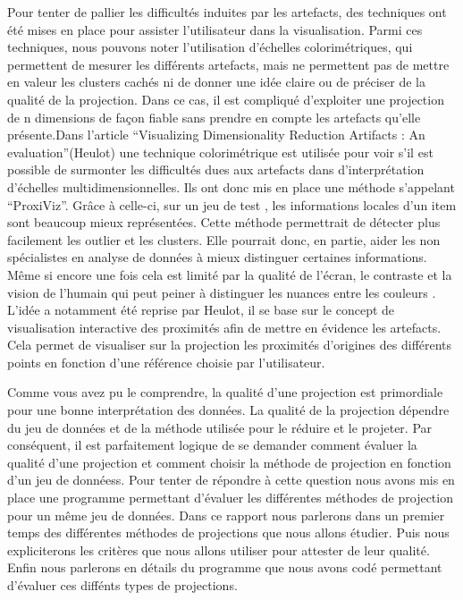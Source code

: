 \smallskip
Pour tenter de pallier les difficultés induites par les artefacts, des techniques ont été mises en place pour assister l’utilisateur dans la visualisation. Parmi ces techniques, nous pouvons noter l’utilisation d’échelles colorimétriques\cite{CheckViz}, qui permettent de mesurer les différents artefacts, mais ne permettent pas de mettre en valeur les clusters cachés ni de donner une idée claire ou de préciser de la qualité de la projection. 
Dans ce cas, il est compliqué d’exploiter une projection de n dimensions de façon fiable sans prendre en compte les artefacts qu’elle présente\cite{aupetit2007visualizing}.Dans l’article “Visualizing Dimensionality Reduction Artifacts : An evaluation”(Heulot) 
une technique colorimétrique est utilisée pour voir s’il est possible de surmonter les difficultés dues aux artefacts dans d’interprétation d’échelles multidimensionnelles. Ils ont donc mis en place une méthode s'appelant “ProxiViz”. Grâce à celle-ci, sur un jeu de test , les informations locales d’un item sont beaucoup mieux représentées. Cette méthode permettrait de détecter plus facilement les outlier et les clusters. 
Elle pourrait donc, en partie, aider les non spécialistes en analyse de données à mieux distinguer certaines informations. Même si encore une fois cela est limité par la qualité de l’écran, le contraste et la vision de l'humain qui peut peiner à distinguer les nuances entre les couleurs\cite{HeulotAnEvaluation} \cite{tran2021approaching} \cite{deering1998human_vision}.
L’idée a notamment été reprise par Heulot\cite{HeulotThese}, il se base sur le concept de visualisation interactive des proximités afin de mettre en évidence les artefacts. Cela permet de visualiser sur la projection les proximités d’origines des différents points en fonction d’une référence choisie par l’utilisateur.

\medskip
Comme vous avez pu le comprendre, la qualité d'une projection est primordiale pour une bonne interprétation des données. La qualité de la projection dépendre du jeu de données et de la méthode utilisée pour le réduire et le projeter.
Par conséquent, il est parfaitement logique de se demander comment évaluer la qualité d'une projection et comment choisir la méthode de projection en fonction d'un jeu de donnéess.
Pour tenter de répondre à cette question nous avons mis en place une programme permettant d'évaluer les différentes méthodes de projection pour un même jeu de données.
Dans ce rapport nous parlerons dans un premier temps des différentes méthodes de projections que nous allons étudier. Puis nous expliciterons les critères que nous allons utiliser pour attester de leur qualité.
Enfin nous parlerons en détails du programme que nous avons codé permettant d'évaluer ces diffénts types de projections.



        







